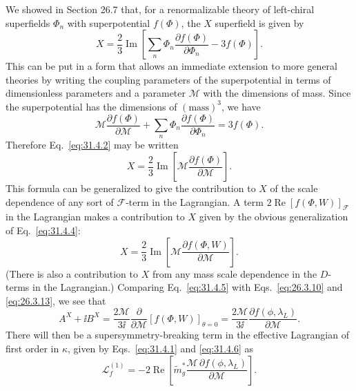 We showed in Section 26.7 that, for a renormalizable theory of left-chiral
superfields \(\Phi_n\) with superpotential \(f(\Phi)\), the \(X\) superfield
is given by
\begin{equation}
  X=\frac23\operatorname{Im}
  \left[
    \sum_n\Phi_n\frac{\partial f(\Phi)}{\partial\Phi_n}
    -3f(\Phi)
  \right].
  \tag{31.4.2}\label{eq:31.4.2}
\end{equation}
This can be put in a form that allows an immediate extension to more
general theories by writing the coupling parameters of the superpotential
in terms of dimensionless parameters and a parameter \(\mathcal M\) with
the dimensions of mass. Since the superpotential has the dimensions of
\((\mathrm{mass})^3\), we have
\begin{equation}
  \mathcal M\frac{\partial f(\Phi)}{\partial\mathcal M}
  +\sum_n\Phi_n\frac{\partial f(\Phi)}{\partial\Phi_n}
  =3f(\Phi).
  \tag{31.4.3}\label{eq:31.4.3}
\end{equation}
Therefore Eq.~\eqref{eq:31.4.2} may be written
\begin{equation}
  X=\frac23\operatorname{Im}
  \left[
    \mathcal M\frac{\partial f(\Phi)}{\partial\mathcal M}
  \right].
  \tag{31.4.4}\label{eq:31.4.4}
\end{equation}
This formula can be generalized to give the contribution to \(X\) of the
scale dependence of any sort of \(\mathcal F\)-term in the Lagrangian. A
term \(2\operatorname{Re}[f(\Phi,W)]_{\mathcal F}\) in the Lagrangian makes
a contribution to \(X\) given by the obvious generalization of
Eq.~\eqref{eq:31.4.4}:
\begin{equation}
  X=\frac23\operatorname{Im}
  \left[
    \mathcal M\frac{\partial f(\Phi,W)}{\partial\mathcal M}
  \right].
  \tag{31.4.5}\label{eq:31.4.5}
\end{equation}
(There is also a contribution to \(X\) from any mass scale dependence in
the \(D\)-terms in the Lagrangian.) Comparing Eq.~\eqref{eq:31.4.5} with
Eqs.~\eqref{eq:26.3.10} and \eqref{eq:26.3.13}, we see that
\begin{equation}
  A^X+\ii B^X
  =\frac{2\mathcal M}{3\ii}\frac{\partial}{\partial\mathcal M}
   [f(\Phi,W)]_{\theta=0}
  =\frac{2\mathcal M}{3\ii}
   \frac{\partial f(\phi,\lambda_L)}{\partial\mathcal M}.
  \tag{31.4.6}\label{eq:31.4.6}
\end{equation}
There will then be a supersymmetry-breaking term in the effective
Lagrangian of first order in \(\kappa\), given by
Eqs.~\eqref{eq:31.4.1} and \eqref{eq:31.4.6} as
\begin{equation}
  \mathcal L_f^{(1)}
  =-2\operatorname{Re}
  \left[
    \widetilde m_g^*
    \frac{\mathcal M\,\partial f(\phi,\lambda_L)}
         {\partial\mathcal M}
  \right].
  \tag{31.4.7}\label{eq:31.4.7}
\end{equation}

